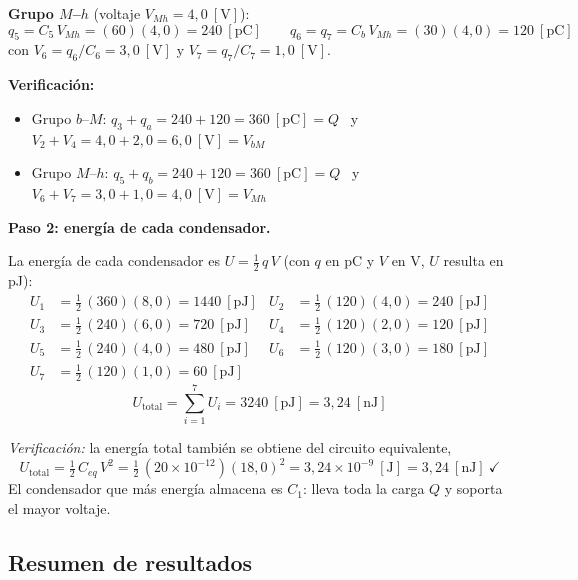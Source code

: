 \documentclass[12pt,letterpaper]{article}
\begin{document}
\medskip
\textbf{Grupo $M$--$h$} (voltaje $V_{Mh} = 4{,}0\ [\text{V}]$):
\[
    \boxed{q_5 = C_5\,V_{Mh} = (60)(4{,}0) = 240\ [\text{pC}]}
    \qquad
    \boxed{q_6 = q_7 = C_b\,V_{Mh} = (30)(4{,}0) = 120\ [\text{pC}]}
\]
con $V_6 = q_6/C_6 = 3{,}0\ [\text{V}]$ y $V_7 = q_7/C_7 = 1{,}0\ [\text{V}]$.

\medskip
\noindent\textbf{Verificaci\'on:}
\begin{itemize}\setlength\itemsep{1pt}
    \item Grupo $b$--$M$: $q_3 + q_a = 240 + 120 = 360\ [\text{pC}] = Q$ \ y \
          $V_2 + V_4 = 4{,}0 + 2{,}0 = 6{,}0\ [\text{V}] = V_{bM}$ \checkmark
    \item Grupo $M$--$h$: $q_5 + q_b = 240 + 120 = 360\ [\text{pC}] = Q$ \ y \
          $V_6 + V_7 = 3{,}0 + 1{,}0 = 4{,}0\ [\text{V}] = V_{Mh}$ \checkmark
\end{itemize}

\medskip
\noindent\textbf{Paso 2: energ\'ia de cada condensador.}

La energ\'ia de cada condensador es $U = \tfrac12\,q\,V$ (con $q$ en pC y $V$ en V, $U$ resulta en pJ):
\begin{align*}
    U_1 &= \tfrac12\,(360)(8{,}0) = 1440\ [\text{pJ}] &
    U_2 &= \tfrac12\,(120)(4{,}0) = 240\ [\text{pJ}]\\[2pt]
    U_3 &= \tfrac12\,(240)(6{,}0) = 720\ [\text{pJ}] &
    U_4 &= \tfrac12\,(120)(2{,}0) = 120\ [\text{pJ}]\\[2pt]
    U_5 &= \tfrac12\,(240)(4{,}0) = 480\ [\text{pJ}] &
    U_6 &= \tfrac12\,(120)(3{,}0) = 180\ [\text{pJ}]\\[2pt]
    U_7 &= \tfrac12\,(120)(1{,}0) = 60\ [\text{pJ}] & &
\end{align*}
\[
    \boxed{U_{\text{total}} = \sum_{i=1}^{7} U_i = 3240\ [\text{pJ}] = 3{,}24\ [\text{nJ}]}
\]

\noindent\textit{Verificaci\'on:} la energ\'ia total tambi\'en se obtiene del circuito equivalente,
\[
    U_{\text{total}} = \tfrac12\,C_{eq}\,V^2 = \tfrac12\,(20\times10^{-12})(18{,}0)^2
                     = 3{,}24\times10^{-9}\ [\text{J}] = 3{,}24\ [\text{nJ}]\ \checkmark
\]
El condensador que m\'as energ\'ia almacena es $C_1$: lleva toda la carga $Q$ y soporta el mayor
voltaje.

\subsection*{Resumen de resultados}
\end{document}
